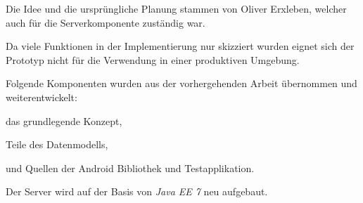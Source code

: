 Die Idee und die ursprüngliche Planung stammen von Oliver Erxleben, welcher auch für die Serverkomponente zuständig war.

Da viele Funktionen in der Implementierung nur skizziert wurden eignet sich der Prototyp nicht für die Verwendung in einer produktiven Umgebung.

Folgende Komponenten wurden aus der vorhergehenden Arbeit übernommen und weiterentwickelt:
\begin{compactitem}
	\item das grundlegende Konzept,
	\item Teile des Datenmodells,
	\item und Quellen der Android Bibliothek und Testapplikation.
\end{compactitem}

Der Server wird auf der Basis von \emph{Java EE 7} neu aufgebaut.
